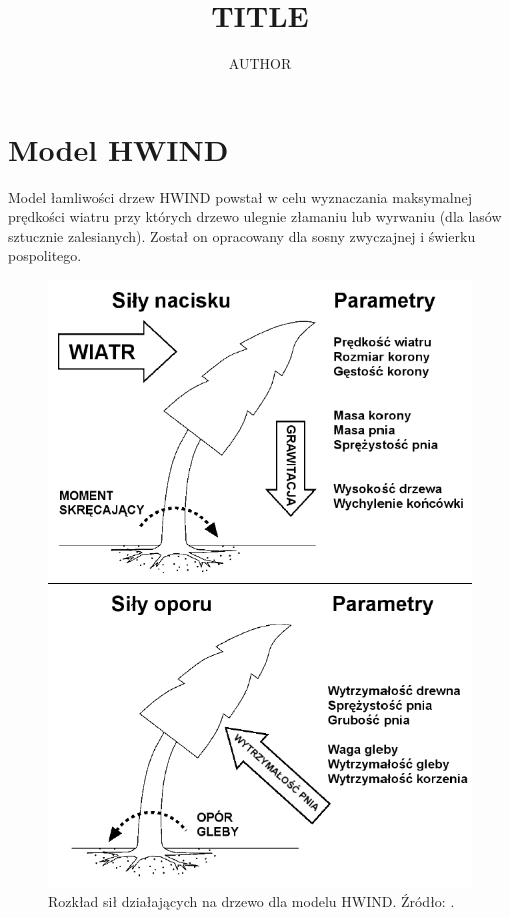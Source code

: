 \documentclass[a4paper,12pt]{article}
\title{TITLE}
\author{AUTHOR}
\begin{document}
\maketitle

\section{Model HWIND}

Model łamliwości drzew HWIND powstał w celu wyznaczania maksymalnej prędkości wiatru przy których drzewo ulegnie złamaniu lub wyrwaniu (dla lasów sztucznie zalesianych). Został on opracowany dla sosny zwyczajnej i świerku pospolitego.

\begin{figure}[!h]
	\center
	\includegraphics[scale=0.45]{HWIND1}
	\caption{Rozkład sił działających na drzewo dla modelu HWIND. Źródło: \cite{chm_mgza}.}
	\label{fig:HWIND1}
\end{figure} 
\end{document}
